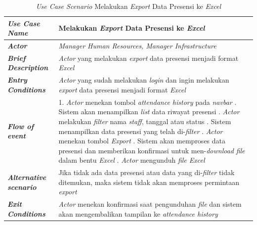 \FloatBarrier
\begin{longtable}{ |p{6cm}|p{8cm}|}
\caption{\textit{Use Case Scenario} Melakukan \textit{Export} Data Presensi ke \textit{Excel}}\label{tab:use-case-scenario-melakukan-export-data-presensi} 
\\
\hline
\textbf{\textit{Use Case Name}}
&Melakukan \textit{Export} Data Presensi ke \textit{Excel}
\\ \hline

\textbf{\textit{Actor}}
&\textit{Manager Human Resources, Manager Infrastructure}
\\ \hline

\textbf{\textit{Brief Description}}
&\textit{Actor} yang melakukan \textit{export} data presensi menjadi format \textit{Excel}
\\ \hline

\textbf{\textit{Entry Conditions}}
&\textit{Actor} yang sudah melakukan \textit{login} dan ingin melakukan \textit{export} data presensi menjadi format \textit{Excel}
\\ \hline

\textbf{\textit{Flow of event}}
&1. \textit{Actor} menekan tombol \textit{attendance history} pada \textit{navbar}
\newline
2. Sistem akan menampilkan \textit{list} data riwayat presensi
\newline
3. \textit{Actor} melakukan \textit{filter} nama \textit{staff}, tanggal atau status
\newline
4. Sistem menampilkan data presensi yang telah di-\textit{filter}
\newline
5. \textit{Actor} menekan tombol \textit{Export}
\newline
6. Sistem akan memproses data presensi dan memberikan konfirmasi untuk men-\textit{download} \textit{file} dalam bentu \textit{Excel}
\newline
7. \textit{Actor} mengunduh \textit{file Excel}
\newline
\\ \hline

\textbf{\textit{Alternative scenario}}
&Jika tidak ada data presensi atau data yang di-\textit{filter} tidak ditemukan, maka sistem tidak akan memproses permintaan \textit{export}
\\ \hline

\textbf{\textit{Exit Conditions}}
&\textit{Actor} menekan konfirmasi saat pengunduhan \textit{file} dan sistem akan mengembalikan tampilan ke \textit{attendance history}
\\ \hline
\end{longtable}

